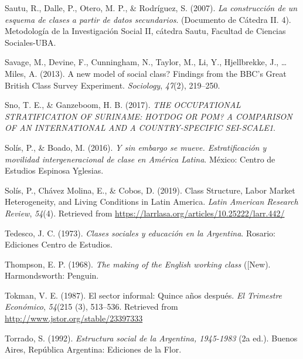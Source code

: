\documentclass[
]{article}
\newlength{\cslhangindent}
\newlength{\cslentryspacingunit} %
\newenvironment{CSLReferences}[2] %
 {%
  \setlength{\parindent}{0pt}
  \ifodd #1
  \let\oldpar\par
  \def\par{\hangindent=\cslhangindent\oldpar}
  \fi
  \setlength{\parskip}{#2\cslentryspacingunit}
 }%
 {}
\begin{document}
\begin{CSLReferences}{1}{0}
\leavevmode{}%
Sautu, R., Dalle, P., Otero, M. P., \& Rodríguez, S. (2007). \emph{La construcción de un esquema de clases a partir de datos secundarios}. (Documento de Cátedra II. 4). Metodología de la Investigación Social II, cátedra Sautu, Facultad de Ciencias Sociales-UBA.

\leavevmode{}%
Savage, M., Devine, F., Cunningham, N., Taylor, M., Li, Y., Hjellbrekke, J., \ldots{} Miles, A. (2013). A new model of social class? {Findings} from the {BBC}'s {Great} {British} {Class} {Survey} {Experiment}. \emph{Sociology}, \emph{47}(2), 219--250.

\leavevmode{}%
Sno, T. E., \& Ganzeboom, H. B. (2017). \emph{{THE} {OCCUPATIONAL} {STRATIFICATION} {OF} {SURINAME}: {HOTDOG} {OR} {POM}? {A} {COMPARISON} {OF} {AN} {INTERNATIONAL} {AND} {A} {COUNTRY}-{SPECIFIC} {SEI}-{SCALE1}}.

\leavevmode{}%
Solís, P., \& Boado, M. (2016). \emph{Y sin embargo se mueve. {Estratificación} y movilidad intergeneracional de clase en {América} {Latina}}. México: Centro de Estudios Espinosa Yglesias.

\leavevmode{}%
Solís, P., Chávez Molina, E., \& Cobos, D. (2019). Class {Structure}, {Labor} {Market} {Heterogeneity}, and {Living} {Conditions} in {Latin} {America}. \emph{Latin American Research Review}, \emph{54}(4). Retrieved from \url{https://larrlasa.org/articles/10.25222/larr.442/}

\leavevmode{}%
Tedesco, J. C. (1973). \emph{Clases sociales y educación en la {Argentina}}. Rosario: Ediciones Centro de Estudios.

\leavevmode{}%
Thompson, E. P. (1968). \emph{The making of the {English} working class} ({[}New). Harmondsworth: Penguin.

\leavevmode{}%
Tokman, V. E. (1987). El sector informal: Quince años después. \emph{El Trimestre Económico}, \emph{54}(215 (3), 513--536. Retrieved from \url{http://www.jstor.org/stable/23397333}

\leavevmode{}%
Torrado, S. (1992). \emph{Estructura social de la {Argentina}, 1945-1983} (2a ed.). Buenos Aires, República Argentina: Ediciones de la Flor.


\end{CSLReferences}
\end{document}
